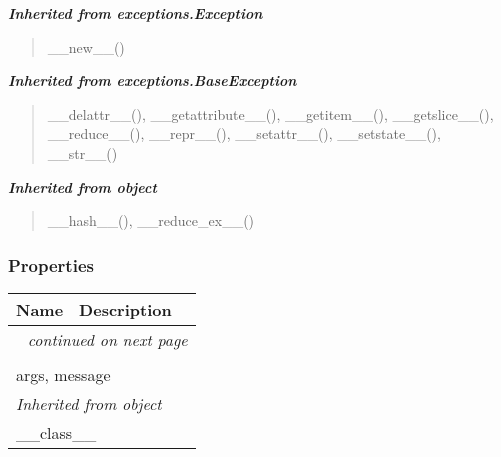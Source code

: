 \large{\textbf{\textit{Inherited from exceptions.Exception}}}

\begin{quote}
\_\_new\_\_()
\end{quote}

\large{\textbf{\textit{Inherited from exceptions.BaseException}}}

\begin{quote}
\_\_delattr\_\_(), \_\_getattribute\_\_(), \_\_getitem\_\_(), \_\_getslice\_\_(), \_\_reduce\_\_(), \_\_repr\_\_(), \_\_setattr\_\_(), \_\_setstate\_\_(), \_\_str\_\_()
\end{quote}

\large{\textbf{\textit{Inherited from object}}}

\begin{quote}
\_\_hash\_\_(), \_\_reduce\_ex\_\_()
\end{quote}


  \subsubsection{Properties}

    \vspace{-1cm}
\hspace{\varindent}\begin{longtable}{|p{\varnamewidth}|p{\vardescrwidth}|l}
\cline{1-2}
\cline{1-2} \centering \textbf{Name} & \centering \textbf{Description}& \\
\cline{1-2}
\endhead\cline{1-2}\multicolumn{3}{r}{\small\textit{continued on next page}}\\\endfoot\cline{1-2}
\endlastfoot\multicolumn{2}{|l|}{\textit{Inherited from exceptions.BaseException}}\\
\multicolumn{2}{|p{\varwidth}|}{\raggedright args, message}\\
\cline{1-2}
\multicolumn{2}{|l|}{\textit{Inherited from object}}\\
\multicolumn{2}{|p{\varwidth}|}{\raggedright \_\_class\_\_}\\
\cline{1-2}
\end{longtable}


